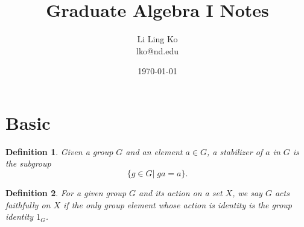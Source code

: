 \documentclass{article}
\newtheorem{mydef}{Definition}[section]
\begin{document}
\title{Graduate Algebra I Notes}
\author{Li Ling Ko\\ lko@nd.edu}
\date{\today}
\maketitle

\section{Basic}
\begin{mydef}
  Given a group $G$ and an element $a\in G$, a \emph{stabilizer} of $a$ in
  $G$ is the subgroup
  \begin{equation*}
    \{g\in G|\; ga=a\}.
  \end{equation*}
\end{mydef}

\begin{mydef}
  For a given group $G$ and its action on a set $X$, we say $G$ acts
  \emph{faithfully} on $X$ if the only group element whose action is
  identity is the group identity $1_G$.
\end{mydef}
\end{document}
